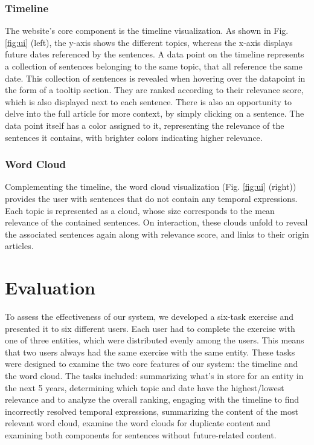 \documentclass[sigconf]{acmart}
\begin{document}
\subsubsection{Timeline}
The website's core component is the timeline visualization. As shown in Fig. \ref{fig:ui} (left), the y-axis shows the different topics, whereas the x-axis displays future dates referenced by the sentences. A data point on the timeline represents a collection of sentences belonging to the same topic, that all reference the same date. This collection of sentences is revealed when hovering over the datapoint in the form of a tooltip section. They are ranked according to their relevance score, which is also displayed next to each sentence. There is also an opportunity to delve into the full article for more context, by simply clicking on a sentence. The data point itself has a color assigned to it, representing the relevance of the sentences it contains, with brighter colors indicating higher relevance.

\subsubsection{Word Cloud}
Complementing the timeline, the word cloud visualization (Fig. \ref{fig:ui} (right)) provides the user with sentences that do not contain any temporal expressions. Each topic is represented as a cloud, whose size corresponds to the mean relevance of the contained sentences. On interaction, these clouds unfold to reveal the associated sentences again along with relevance score, and links to their origin articles.

\section{Evaluation}
To assess the effectiveness of our system, we developed a six-task exercise and presented it to six different users. Each user had to complete the exercise with one of three entities, which were distributed evenly among the users. This means that two users always had the same exercise with the same entity.
These tasks were designed to examine the two core features of our system: the timeline and the word cloud.
The tasks included: summarizing what's in store for an entity in the next 5 years, determining which topic and date have the highest/lowest relevance and to analyze the overall ranking, engaging with the timeline to find incorrectly resolved temporal expressions, summarizing the content of the most relevant word cloud, examine the word clouds for duplicate content and examining both components for sentences without future-related content.
\end{document}
